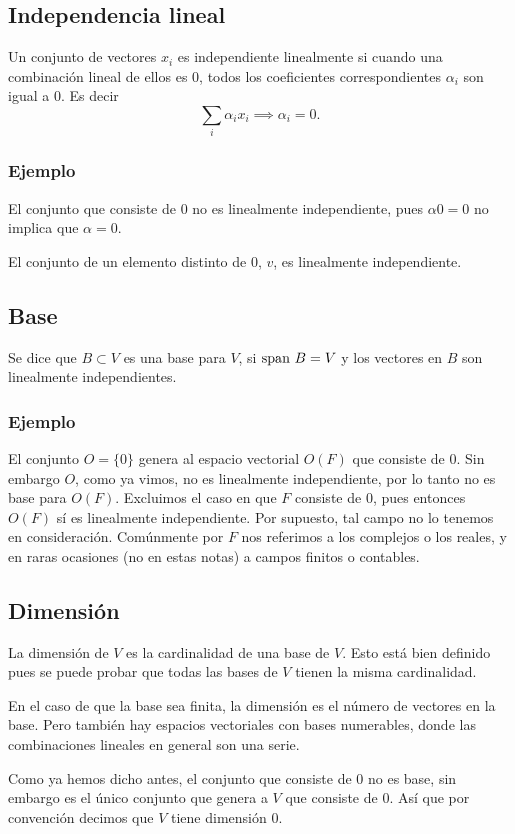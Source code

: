 \documentclass{article}
\begin{document}
\subsection{Independencia lineal}
Un conjunto de vectores $x_i$ es independiente linealmente si
cuando una combinación lineal de ellos es $0$, todos los coeficientes
correspondientes $\alpha_i$ son igual a $0$. Es decir
$$\sum_i \alpha_i x_i \implies \alpha_i = 0.$$

\subsubsection*{Ejemplo}
El conjunto que consiste de $0$ no es linealmente independiente, pues
$\alpha 0 = 0$ no implica que $\alpha = 0$.

El conjunto de un elemento distinto de $0$, $v$, es linealmente independiente.

\subsection{Base}
Se dice que $B\subset V$ es una base para $V$, si
$\text{span } B = V$ y los vectores en $B$ son linealmente
independientes.

\subsubsection*{Ejemplo}
El conjunto $O=\{0\}$ genera al espacio vectorial $O(F)$
que consiste de $0$. Sin embargo $O$, como ya vimos, no es linealmente independiente,
por lo tanto no es base para $O(F)$.
Excluimos el caso en que $F$ consiste de $0$, pues entonces $O(F)$ sí es linealmente independiente.
Por supuesto, tal campo no lo tenemos en consideración. Comúnmente por $F$ nos referimos
a los complejos o los reales, y en raras ocasiones (no en estas notas)
a campos finitos o contables.

\subsection{Dimensión}
La dimensión de $V$ es la cardinalidad de una base de $V$.
Esto está bien definido pues se puede probar que todas las bases de
$V$ tienen la misma cardinalidad. 

En el caso de que la base sea
finita, la dimensión es el número de vectores en la base. Pero
también hay espacios vectoriales con bases numerables, 
donde las combinaciones lineales en general son una serie.

Como ya hemos dicho antes, el conjunto que consiste de $0$ no es base, sin embargo es el único conjunto que genera a $V$ que consiste de $0$. Así que por convención decimos que $V$ tiene dimensión $0$.
\newpage
\end{document}
